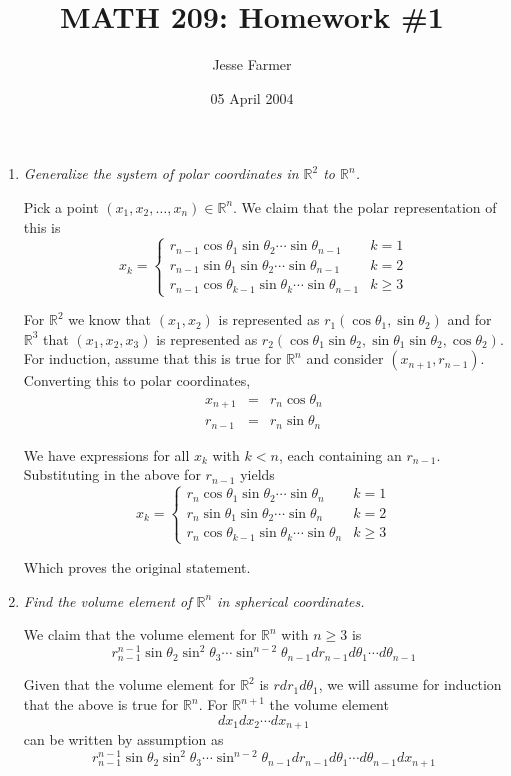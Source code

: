 \documentclass[11pt]{article}
\title{MATH 209: Homework \#1}
\author{Jesse Farmer}
\date{05 April 2004}
\begin{document}
\maketitle
\begin{enumerate}
\item \emph{Generalize the system of polar coordinates in $\mathbb{R}^2$ to $\mathbb{R}^n$.}

Pick a point $(x_1,x_2, \ldots, x_n) \in \mathbb{R}^n$.  We claim that the polar representation of this is
\[
x_k = 
\begin{cases} 
r_{n-1} \cos\theta_1 \sin\theta_2 \cdots \sin\theta_{n-1} & k=1 \\ 
r_{n-1} \sin\theta_1 \sin\theta_2 \cdots \sin\theta_{n-1} & k=2 \\
r_{n-1} \cos\theta_{k-1} \sin\theta_k \cdots \sin\theta_{n-1} & k \geq 3  \end{cases}
\]

For $\mathbb{R}^2$ we know that $(x_1,x_2)$ is represented as $r_1(\cos\theta_1, \sin\theta_2)$ and for $\mathbb{R}^3$ that $(x_1,x_2,x_3)$ is represented as $r_2(\cos\theta_1 \sin\theta_2, \sin\theta_1 \sin\theta_2, \cos\theta_2)$.  For induction, assume that this is true for $\mathbb{R}^n$ and consider $(x_{n+1}, r_{n-1})$.  Converting this to polar coordinates,
\begin{eqnarray*}
x_{n+1} &=& r_n\cos\theta_n \\
r_{n-1} &=& r_n\sin\theta_n
\end{eqnarray*}

We have expressions for all $x_k$ with $k < n$, each containing an $r_{n-1}$.  Substituting in the above for $r_{n-1}$ yields
\[
x_k = 
\begin{cases}
r_n \cos\theta_1 \sin\theta_2 \cdots \sin\theta_{n} & k=1 \\ 
r_n \sin\theta_1 \sin\theta_2 \cdots \sin\theta_{n} & k=2 \\
r_n \cos\theta_{k-1} \sin\theta_k \cdots \sin\theta_{n} & k \geq 3
\end{cases}
\]

Which proves the original statement.
\item \emph{Find the volume element of $\mathbb{R}^n$ in spherical coordinates.}

We claim that the volume element for $\mathbb{R}^n$ with $n \geq 3$ is
\[
r_{n-1}^{n-1} \sin\theta_2 \sin^2\theta_3 \cdots \sin^{n-2}\theta_{n-1} dr_{n-1} d\theta_1 \cdots d\theta_{n-1}
\]

Given that the volume element for $\mathbb{R}^2$ is $rdr_1d\theta_1$, we will assume for induction that the above is true for $\mathbb{R}^n$.  For $\mathbb{R}^{n+1}$ the volume element
\[
dx_1dx_2 \cdots dx_{n+1}
\]
can be written by assumption as
\[
r_{n-1}^{n-1} \sin\theta_2 \sin^2\theta_3 \cdots \sin^{n-2}\theta_{n-1} dr_{n-1} d\theta_1 \cdots d\theta_{n-1} dx_{n+1}
\]


\end{enumerate}
\end{document}
